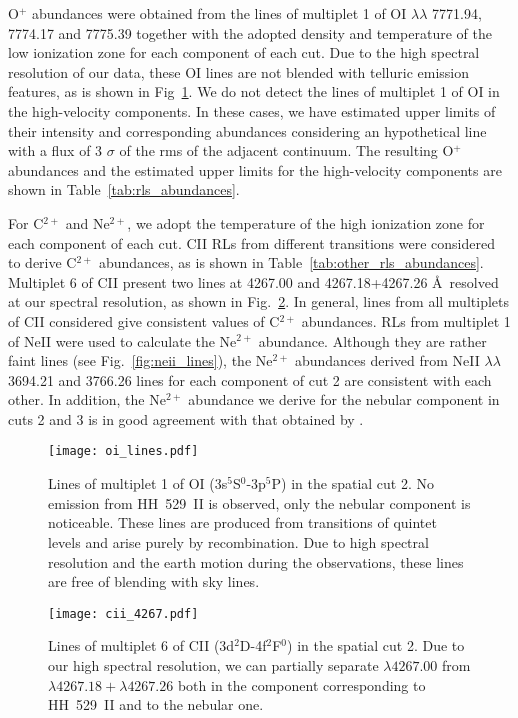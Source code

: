 \documentclass[fleqn,usenatbib]{mnras}
\begin{document}
O$^{+}$ abundances were obtained from the lines of multiplet 1 of O\thinspace I $\lambda \lambda$ 7771.94, 7774.17 and 7775.39 together with the adopted density and temperature of the low ionization zone for each component of each cut. Due to the high spectral resolution of our data, these O\thinspace I lines are not blended with telluric emission features, as is shown in Fig~\ref{fig:oi_lines}. We do not detect the lines of multiplet 1 of \mbox{O}\thinspace \mbox{I} in the high-velocity components. In these cases, we have estimated upper limits of their intensity and corresponding abundances considering an hypothetical line with a flux of 3 $\sigma$ of the rms of the adjacent continuum.  The resulting O$^+$ abundances and the estimated upper limits for the high-velocity components are shown in Table~\ref{tab:rls_abundances}.

For C$^{2+}$ and Ne$^{2+}$, we adopt the temperature of the high ionization zone for each component of each cut. C\thinspace II RLs from different transitions were considered to derive C$^{2+}$ abundances, as is shown in Table~\ref{tab:other_rls_abundances}. Multiplet 6 of C\thinspace II present two lines at 4267.00 and 4267.18+4267.26 \AA\, resolved at our spectral resolution, as shown in Fig.~\ref{fig:cii_lines}. In general, lines from all multiplets of C\thinspace II considered give consistent values of C$^{2+}$ abundances. RLs from multiplet 1 of Ne\thinspace II were used to calculate the Ne$^{2+}$ abundance. Although they are rather faint lines (see Fig.~\ref{fig:neii_lines}), the Ne$^{2+}$ abundances derived from Ne\thinspace II  $\lambda\lambda$ 3694.21 and 3766.26 lines for each component of cut 2 are consistent with each other. In addition, the Ne$^{2+}$ abundance we derive for the nebular component in cuts 2 and 3 is in good agreement with that obtained by \citet[][see their Table~11]{Esteban04}.

\begin{figure}
\texttt{[image: oi\_lines.pdf]}
\caption{Lines of multiplet 1 of O\thinspace I (3s$^{5}$S$^{0}$-3p$^{5}$P) in the spatial cut 2. No emission from HH~529~II is observed, only the nebular component is noticeable. These lines are produced from transitions of quintet levels \citep{grandi75a} and arise  purely by recombination. Due to high spectral resolution and the earth motion during the observations, these lines are free of blending with sky lines. }
\label{fig:oi_lines}
\end{figure}

\begin{figure}
\texttt{[image: cii\_4267.pdf]}
\caption{Lines of multiplet 6 of C\thinspace II (3d$^{2}$D-4f$^{2}$F$^{0}$) in the spatial cut 2. Due to our high spectral resolution, we can partially separate $\lambda 4267.00$ from $\lambda 4267.18+\lambda4267.26 $ both in the component corresponding to HH~529~II and to the nebular one. }
\label{fig:cii_lines}
\end{figure}
\end{document}
